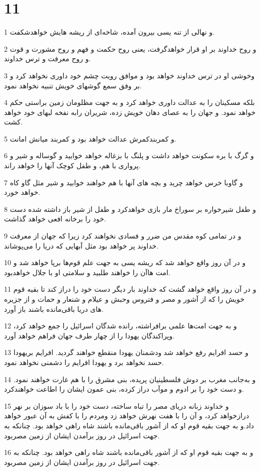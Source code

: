 \chapter{11}

\par 1 و نهالی از تنه یسی بیرون آمده، شاخه‌ای از ریشه هایش خواهدشکفت.
\par 2 و روح خداوند بر او قرار خواهدگرفت، یعنی روح حکمت و فهم و روح مشورت و قوت و روح معرفت و ترس خداوند.
\par 3 وخوشی او در ترس خداوند خواهد بود و موافق رویت چشم خود داوری نخواهد کرد و بر وفق سمع گوشهای خویش تنبیه نخواهد نمود.
\par 4 بلکه مسکینان را به عدالت داوری خواهد کرد و به جهت مظلومان زمین براستی حکم خواهد نمود. و جهان را به عصای دهان خویش زده، شریران رابه نفخه لبهای خود خواهد کشت.
\par 5 و کمربندکمرش عدالت خواهد بود و کمربند میانش امانت.
\par 6 و گرگ با بره سکونت خواهد داشت و پلنگ با بزغاله خواهد خوابید و گوساله و شیر و پرواری با هم، و طفل کوچک آنها را خواهد راند.
\par 7 و گاوبا خرس خواهد چرید و بچه های آنها با هم خواهند خوابید و شیر مثل گاو کاه خواهد خورد.
\par 8 و طفل شیرخواره بر سوراخ مار بازی خواهدکرد و طفل از شیر باز داشته شده دست خود را برخانه افعی خواهد گذاشت.
\par 9 و در تمامی کوه مقدس من ضرر و فسادی نخواهند کرد زیرا که جهان از معرفت خداوند پر خواهد بود مثل آبهایی که دریا را می‌پوشاند.
\par 10 و در آن روز واقع خواهد شد که ریشه یسی به جهت علم قوم‌ها برپا خواهد شد و امت هاآن را خواهند طلبید و سلامتی او با جلال خواهدبود.
\par 11 و در آن روز واقع خواهد گشت که خداوند بار دیگر دست خود را دراز کند تا بقیه قوم خویش را که از آشور و مصر و فتروس وحبش و عیلام و شنعار و حمات و از جزیره های دریا باقی‌مانده باشند باز آورد.
\par 12 و به جهت امت‌ها علمی برافراشته، رانده شدگان اسرائیل را جمع خواهد کرد، وپراکندگان یهودا را از چهار طرف جهان فراهم خواهد آورد.
\par 13 و حسد افرایم رفع خواهد شد ودشمنان یهودا منقطع خواهند گردید. افرایم بریهودا حسد نخواهد برد و یهودا افرایم را دشمنی نخواهد نمود.
\par 14 و به‌جانب مغرب بر دوش فلسطینیان پریده، بنی مشرق را با هم غارت خواهند نمود. و دست خود را بر ادوم و موآب دراز کرده، بنی عمون ایشان را اطاعت خواهندکرد.
\par 15 و خداوند زبانه دریای مصر را تباه ساخته، دست خود را با باد سوزان بر نهر درازخواهد کرد، و آن را با هفت نهرش خواهد زد ومردم را با کفش به آن عبور خواهد داد.و به جهت بقیه قوم او که از آشور باقی‌مانده باشند شاه راهی خواهد بود. چنانکه به جهت اسرائیل در روز بر‌آمدن ایشان از زمین مصربود.
\par 16 و به جهت بقیه قوم او که از آشور باقی‌مانده باشند شاه راهی خواهد بود. چنانکه به جهت اسرائیل در روز بر‌آمدن ایشان از زمین مصربود. 
 

